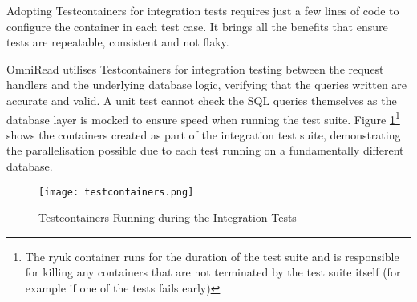 Adopting Testcontainers for integration tests requires just a few lines of code to configure the container in each test case.
It brings all the benefits that ensure tests are repeatable, consistent and not flaky.

OmniRead utilises Testcontainers for integration testing between the request handlers and the underlying database logic, verifying that the queries written are accurate and valid.
A unit test cannot check the SQL queries themselves as the database layer is mocked to ensure speed when running the test suite.
Figure \ref{fig:testcontainers}\footnote{The ryuk container runs for the duration of the test suite and is responsible for killing any containers that are not terminated by the test suite itself (for example if one of the tests fails early)} shows the containers created as part of the integration test suite, demonstrating the parallelisation possible due to each test running on a fundamentally different database.

\begin{figure}[htbp]
\texttt{[image: testcontainers.png]}
\centering
\caption{Testcontainers Running during the Integration Tests}
\label{fig:testcontainers}
\end{figure}
